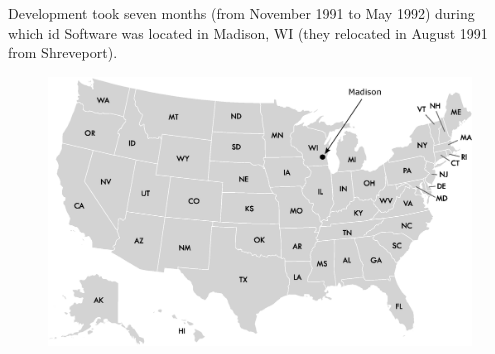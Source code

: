 \documentclass[book.tex]{subfiles}
\begin{document}
Development took seven months (from November 1991 to May 1992) during which id Software was located in Madison, WI (they relocated in August 1991 from Shreveport).
\begin{figure}[H]
\centering
 \includegraphics[width=\textwidth]{imgs/drawings/map/usa-id-software.eps}
 \end{figure}
\end{document}
